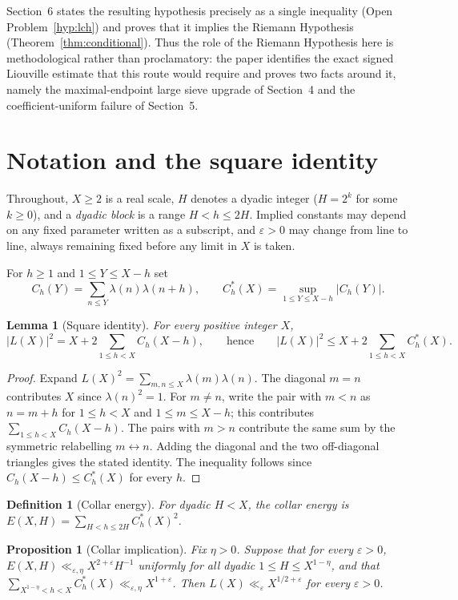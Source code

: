 \documentclass[11pt]{article}
\newtheorem{lemma}[theorem]{Lemma}
\newtheorem{proposition}[theorem]{Proposition}
\newtheorem{definition}[theorem]{Definition}
\begin{document}
Section~6 states the resulting hypothesis precisely as a single inequality (Open Problem~\ref{hyp:lch}) and
proves that it implies the Riemann Hypothesis (Theorem~\ref{thm:conditional}). Thus the role of the
Riemann Hypothesis here is methodological rather than proclamatory: the paper identifies the exact signed
Liouville estimate that this route would require and proves two facts around it, namely the maximal-endpoint
large sieve upgrade of Section~4 and the coefficient-uniform failure of Section~5.

\section{Notation and the square identity}

Throughout, $X\ge2$ is a real scale, $H$ denotes a dyadic integer ($H=2^k$ for some $k\ge0$), and a
\emph{dyadic block} is a range $H<h\le 2H$. Implied constants may depend on any fixed parameter written
as a subscript, and $\varepsilon>0$ may change from line to line, always remaining fixed before any limit
in $X$ is taken.

For $h\ge1$ and $1\le Y\le X-h$ set
\[
C_h(Y)=\sum_{n\le Y}\lambda(n)\lambda(n+h),\qquad
C_h^\ast(X)=\sup_{1\le Y\le X-h}|C_h(Y)|.
\]

\begin{lemma}[Square identity]
\label{lem:square}
For every positive integer $X$,
\[
|L(X)|^2=X+2\sum_{1\le h<X}C_h(X-h),\qquad\text{hence}\qquad
|L(X)|^2\le X+2\sum_{1\le h<X}C_h^\ast(X).
\]
\end{lemma}

\begin{proof}
Expand $L(X)^2=\sum_{m,n\le X}\lambda(m)\lambda(n)$. The diagonal $m=n$ contributes $X$ since
$\lambda(n)^2=1$. For $m\neq n$, write the pair with $m<n$ as $n=m+h$ for $1\le h<X$ and $1\le m\le X-h$;
this contributes $\sum_{1\le h<X}C_h(X-h)$. The pairs with $m>n$ contribute the same sum by the symmetric
relabelling $m\leftrightarrow n$. Adding the diagonal and the two off-diagonal triangles gives the stated
identity. The inequality follows since $C_h(X-h)\le C_h^\ast(X)$ for every $h$.
\end{proof}

\begin{definition}[Collar energy]
For dyadic $H<X$, the \emph{collar energy} is $E(X,H)=\displaystyle\sum_{H<h\le 2H}C_h^\ast(X)^2$.
\end{definition}

\begin{proposition}[Collar implication]
\label{prop:collarimp}
Fix $\eta>0$. Suppose that for every $\varepsilon>0$,
$E(X,H)\ll_{\varepsilon,\eta}X^{2+\varepsilon}H^{-1}$
uniformly for all dyadic $1\le H\le X^{1-\eta}$, and that
$\sum_{X^{1-\eta}<h<X}C_h^\ast(X)\ll_{\varepsilon,\eta}X^{1+\varepsilon}$.
Then $L(X)\ll_\varepsilon X^{1/2+\varepsilon}$ for every $\varepsilon>0$.
\end{proposition}
\end{document}

